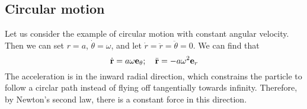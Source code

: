 \subsection{Circular motion}
Let us consider the example of circular motion with constant angular velocity.
Then we can set \(r = a\), \(\dot\theta = \omega\), and let \(\dot r = \ddot r = \ddot \theta = 0\).
We can find that
\[
	\dot {\vb r} = a \omega \vb e_\theta ;\quad \ddot{\vb r} = -a\omega^2 \vb e_r
\]
The acceleration is in the inward radial direction, which constrains the particle to follow a circlar path instead of flying off tangentially towards infinity.
Therefore, by Newton's second law, there is a constant force in this direction.
